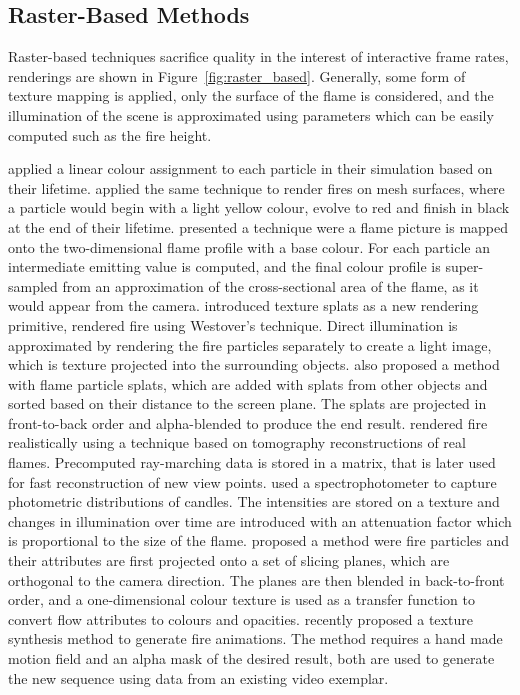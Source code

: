 \subsection{Raster-Based Methods}
\label{sec:raster_based}

Raster-based techniques sacrifice quality in the interest of interactive frame rates, renderings are shown in Figure~\ref{fig:raster_based}.
Generally, some form of texture mapping is applied, only the surface of the flame is considered, and the illumination of the scene is approximated using parameters which can be easily computed such as the fire height.

\cite{Reeves:1983} applied a linear colour assignment to each particle in their simulation based on their lifetime.
\cite{Lee:2001} applied the same technique to render fires on mesh surfaces, where a particle would begin with a light yellow colour, evolve to red and finish in black at the end of their lifetime.
\cite{Lamorlette:2002} presented a technique were a flame picture is mapped onto the two-dimensional flame profile with a base colour.
For each particle an intermediate emitting value is computed, and the final colour profile is super-sampled from an approximation of the cross-sectional area of the flame, as it would appear from the camera.
\cite{Westover:1990} introduced texture splats as a new rendering primitive, \cite{Wei:2002} rendered fire using Westover's technique.
Direct illumination is approximated by rendering the fire particles separately to create a light image, which is texture projected into the surrounding objects.
\cite{Zhao:2003} also proposed a method with flame particle splats, which are added with splats from other objects and sorted based on their distance to the screen plane.
The splats are projected in front-to-back order and alpha-blended to produce the end result.
\cite{Ihrke:2004} rendered fire realistically using a technique based on tomography reconstructions of real flames.
Precomputed ray-marching data is stored in a matrix, that is later used for fast reconstruction of new view points.
\cite{Bridault:2006} used a spectrophotometer to capture photometric distributions of candles.
The intensities are stored on a texture and changes in illumination over time are introduced with an attenuation factor which is proportional to the size of the flame.
\cite{Zhang:2011} proposed a method were fire particles and their attributes are first projected onto a set of slicing planes, which are orthogonal to the camera direction. 
The planes are then blended in back-to-front order, and a one-dimensional colour texture is used as a transfer function to convert flow attributes to colours and opacities. 
\cite{Jamriska:2015} recently proposed a texture synthesis method to generate fire animations.
The method requires a hand made motion field and an alpha mask of the desired result, both are used to generate the new sequence using data from an existing video exemplar.

